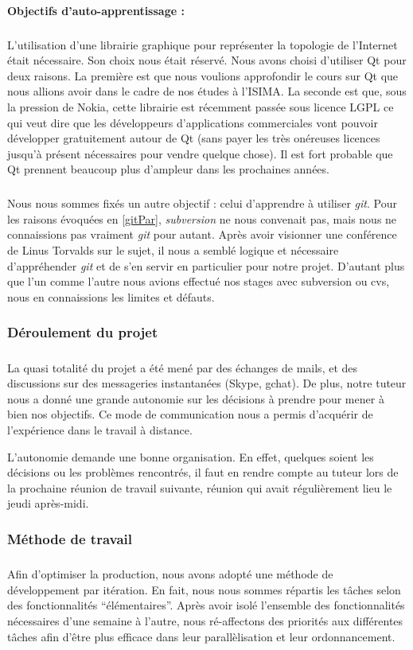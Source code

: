 \paragraph{Objectifs d'auto-apprentissage : }
\subparagraph{}
L'utilisation d'une librairie graphique pour représenter la topologie de l'Internet était nécessaire. Son choix nous était réservé. Nous avons choisi d'utiliser Qt pour deux raisons. La première est que nous voulions approfondir le cours sur Qt que nous allions avoir dans le cadre de nos études à l'ISIMA. La seconde est que, sous la pression de Nokia, cette librairie est récemment passée sous licence LGPL ce qui veut dire que les développeurs d'applications commerciales vont pouvoir développer gratuitement autour de Qt (sans payer les très onéreuses licences jusqu'à présent nécessaires pour vendre quelque chose). Il est fort probable que Qt prennent beaucoup plus d'ampleur dans les prochaines années.

\subparagraph{}
Nous nous sommes fixés un autre objectif : celui d'apprendre à utiliser \textit{git}. Pour les raisons évoquées en \ref{gitPar}, \textit{subversion} ne nous convenait pas, mais nous ne connaissions pas vraiment \textit{git} pour autant. Après avoir visionner une conférence de Linus Torvalds sur le sujet, il nous a semblé logique et nécessaire d'appréhender \textit{git} et de s'en servir en particulier pour notre projet. D'autant plus que l'un comme l'autre nous avions effectué nos stages avec subversion ou cvs, nous en connaissions les limites et d\'efauts.

\subsubsection{Déroulement du projet}
\subparagraph{}
La quasi totalité du projet a été mené par des échanges de mails, et des discussions sur des messageries instantanées (Skype, gchat). De plus, notre tuteur nous a donné une grande autonomie sur les décisions à prendre pour mener à bien nos objectifs. Ce mode de communication nous a permis d'acqu\'erir de l'expérience dans le travail à distance.

L'autonomie demande une bonne organisation. En effet, quelques soient les décisions ou les problèmes rencontrés, il faut en rendre compte au tuteur lors de la prochaine réunion de travail suivante, réunion qui avait régulièrement lieu le jeudi après-midi.

\subsubsection{Méthode de travail}
\subparagraph{}
Afin d'optimiser la production, nous avons adopté une méthode de développement par itération. En fait, nous nous sommes répartis les tâches selon des fonctionnalités ``élémentaires''. Après avoir isolé l'ensemble des fonctionnalités nécessaires d'une semaine à l'autre, nous ré-affectons des priorités aux différentes tâches afin d'être plus efficace dans leur parallèlisation et leur ordonnancement.

